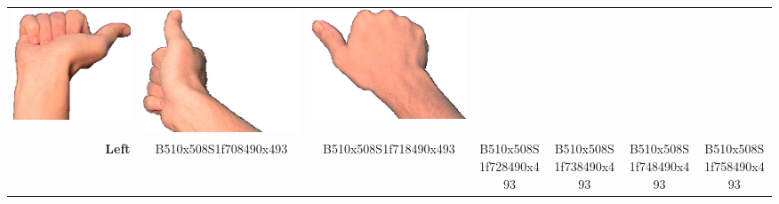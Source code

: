 \documentclass{article}
\begin{document}
\begin{center}
\begin{tabular}{r*{6}{c}}
\includegraphics[scale=0.1]{images/10-03-4.jpg}&
\includegraphics[scale=0.1]{images/10-03-5.jpg}&
\includegraphics[scale=0.1]{images/10-03-6.jpg}\\
\textbf{Left}&
B510x508S1f708490x493&
B510x508S1f718490x493&
B510x508S1f728490x493&
B510x508S1f738490x493&
B510x508S1f748490x493&
B510x508S1f758490x493\\
\end{tabular}
\end{center}
\end{document}

